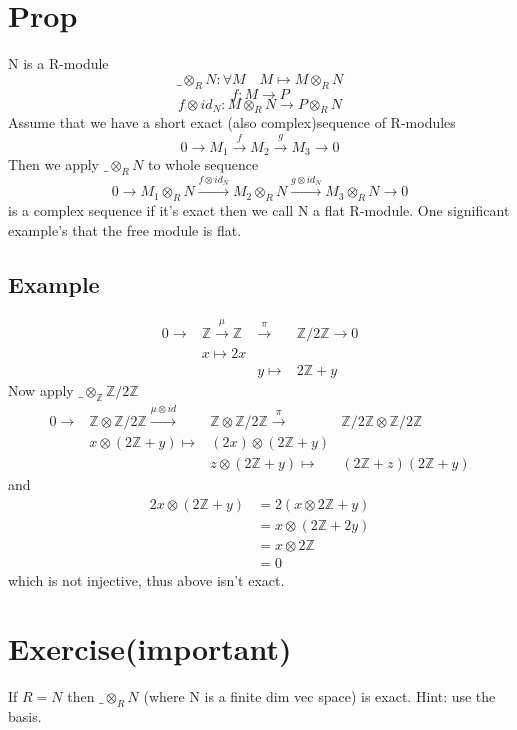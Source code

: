 \documentclass{book}
\begin{document}
\section{Prop}
N is a R-module 
$$\_\otimes_RN:\forall M\quad M\mapsto M\otimes_RN$$
$$f:M\rightarrow P$$
$$f\otimes id_N:M\otimes_RN\rightarrow P\otimes_RN$$
Assume that we have a short exact (also complex)sequence of R-modules
$$0\rightarrow M_1\stackrel{f}{\rightarrow}M_2\stackrel{g}{\rightarrow}M_3\rightarrow 0$$
Then we apply $\_\otimes_RN$ to whole sequence
$$0\rightarrow M_1\otimes_RN\stackrel{f\otimes id_N}{\rightarrow}M_2\otimes_RN\stackrel{g\otimes id_N}{\rightarrow}M_3\otimes_RN\rightarrow 0$$
is a complex sequence if it's exact then we call N a flat R-module. One significant example's that the free module is flat.
\subsection{Example}
$$
\begin{aligned}
    0\rightarrow &\mathbb{Z}\stackrel{\mu}\rightarrow \mathbb{Z}&\stackrel{\pi}\rightarrow &\mathbb{Z}/2\mathbb{Z}\rightarrow0\\
    &x\mapsto 2x& &\\
    & &y \mapsto &2\mathbb{Z}+y
\end{aligned}
$$
Now apply $\_\otimes_\mathbb{Z}\mathbb{Z}/2\mathbb{Z}$
$$
\begin{aligned}
    0\rightarrow &\mathbb{Z}\otimes\mathbb{Z}/2\mathbb{Z}\stackrel{\mu\otimes id}\rightarrow &\mathbb{Z}\otimes\mathbb{Z}/2\mathbb{Z}\stackrel{\pi}\rightarrow &\mathbb{Z}/2\mathbb{Z}\otimes\mathbb{Z}/2\mathbb{Z}\\
    & x\otimes(2\mathbb{Z}+y)\mapsto &(2x)\otimes(2\mathbb{Z}+y) & \\
    & &z\otimes(2\mathbb{Z}+y)\mapsto &(2\mathbb{Z}+z)(2\mathbb{Z}+y)
\end{aligned}
$$
and 
$$
\begin{aligned}
    2x\otimes(2\mathbb{Z}+y) &=2(x\otimes 2\mathbb{Z}+y)\\
    &=x\otimes(2\mathbb{Z}+2y)\\
    &=x\otimes 2\mathbb{Z}\\
    &=0
\end{aligned}
$$
which is not injective, thus above isn't exact.
\section{Exercise(important)}
If $R=N$ then $\_\otimes_RN$ (where N is a finite dim vec space) is exact. Hint: use the basis.
\end{document}
